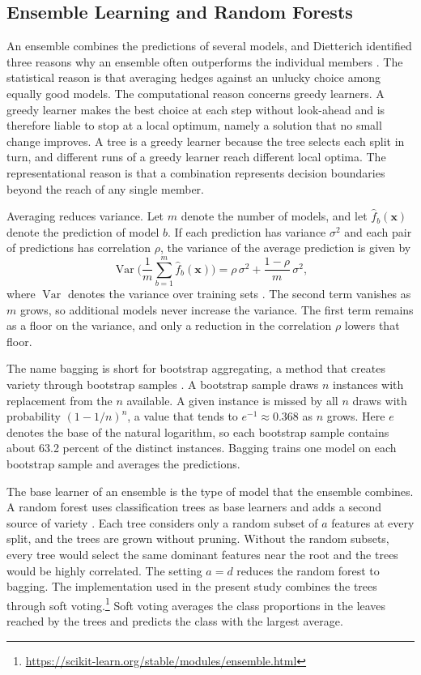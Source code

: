 \documentclass[conference]{IEEEtran}
\begin{document}
\subsection{Ensemble Learning and Random Forests}

An ensemble combines the predictions of several models, and Dietterich identified
three reasons why an ensemble often outperforms the individual members
\cite{dietterich2000}. The statistical reason is that averaging hedges against an
unlucky choice among equally good models. The computational reason concerns
greedy learners. A greedy learner makes the best choice at each step without
look-ahead and is therefore liable to stop at a local optimum, namely a solution
that no small change improves. A tree is a greedy learner because the tree selects each
split in turn, and different runs of a greedy learner reach different local
optima. The representational reason is that a combination represents decision
boundaries beyond the reach of any single member.

Averaging reduces variance. Let $m$ denote the number of models, and let
$\hat{f}_b(\mathbf{x})$ denote the prediction of model $b$. If each prediction has
variance $\sigma^2$ and each pair of predictions has correlation $\rho$, the
variance of the average prediction is given by
\begin{equation}
\operatorname{Var}\Big(\frac{1}{m}\sum_{b=1}^{m} \hat{f}_b(\mathbf{x})\Big)
= \rho\,\sigma^2 + \frac{1-\rho}{m}\,\sigma^2 ,
\end{equation}
where $\operatorname{Var}$ denotes the variance over training sets
\cite{hastie2009}. The second term vanishes as $m$ grows, so additional models
never increase the variance. The first term remains as a floor on the variance,
and only a reduction in the correlation $\rho$ lowers that floor.

The name bagging is short for bootstrap aggregating, a method that creates variety
through bootstrap samples \cite{breiman1996}. A bootstrap sample draws $n$
instances with replacement from the $n$ available. A given instance is missed by
all $n$ draws with probability $(1 - 1/n)^n$, a value that tends to
$e^{-1} \approx 0.368$ as $n$ grows. Here $e$ denotes the base of the natural
logarithm, so each bootstrap sample contains about 63.2 percent of the distinct
instances. Bagging trains one model on each bootstrap sample and averages the
predictions.

The base learner of an ensemble is the type of model that the ensemble combines. A
random forest uses classification trees as base learners and adds a second source
of variety \cite{breiman2001}. Each tree considers only a random subset of $a$
features at every split, and the trees are grown without pruning. Without the
random subsets, every tree would select the same dominant features near the root
and the trees would be highly correlated. The setting $a = d$ reduces the random
forest to bagging. The implementation used in the present study combines the
trees through soft
voting.\footnote{\url{https://scikit-learn.org/stable/modules/ensemble.html}}
Soft voting averages the class proportions in the leaves reached by the trees and
predicts the class with the largest average.
\end{document}
